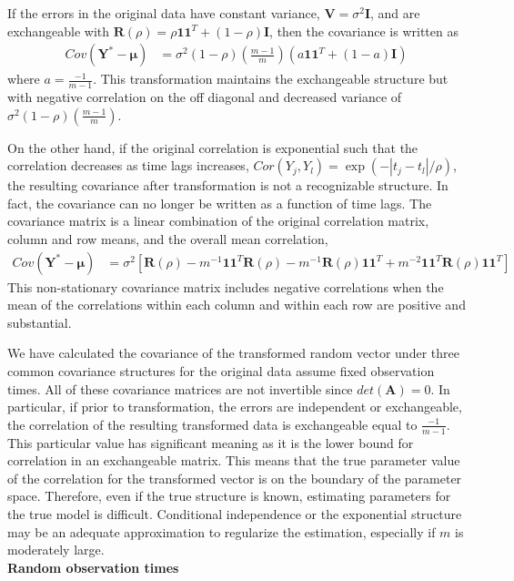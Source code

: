 \documentclass[12pt]{article}
\newcommand{\B}[0]{\mathbf}
\newcommand{\BS}[0]{\boldsymbol}
\begin{document}
 If the errors in the original data have constant variance, $\B V=\sigma^{2}\B I$, and are exchangeable with $\B R(\rho) = \rho\B 1 \B 1^{T} + (1-\rho)\B I$, then the covariance is written as
 \begin{align*}
 Cov(\B Y^{*}- \BS\mu) &=\sigma^{2}(1-\rho)\left(\frac{m-1}{m}\right)(a\B 1\B 1^{T}+ (1-a)\B I)
 \end{align*} 
 where $a=\frac{-1}{m-1}$. This transformation maintains the exchangeable structure but with negative correlation on the off diagonal and decreased variance of $\sigma^{2}(1-\rho)\left(\frac{m-1}{m}\right)$.

 On the other hand, if the original correlation is exponential such that the correlation decreases as time lags increases, $Cor(Y_{j},Y_{l}) = \exp(-|t_{j}-t_{l}|/\rho)$, the resulting covariance after transformation is not a recognizable structure. In fact, the covariance can no longer be written as a function of time lags. The covariance matrix is a linear combination of the original correlation matrix, column and row means, and the overall mean correlation,
   \begin{align*}
 Cov(\B Y^{*}- \BS\mu)  &= \sigma^{2}\left[\B R(\rho)-m^{-1}\B1\B1^{T}\B R(\rho)-m^{-1}\B R(\rho)\B1\B1^{T} + m^{-2}\B1\B1^{T}\B R(\rho)\B1\B1^{T}\right]
 \end{align*} 
 This non-stationary covariance matrix includes negative correlations when the mean of the correlations within each column and within each row are positive and substantial.
 
We have calculated the covariance of the transformed random vector under three common covariance structures for the original data assume fixed observation times. All of these covariance matrices are not invertible since $det(\B A) = 0$. In particular, if prior to transformation, the errors are independent or exchangeable, the correlation of the resulting transformed data is exchangeable equal to $\frac{-1}{m-1}$. This particular value has significant meaning as it is the lower bound for correlation in an exchangeable matrix. This means that the true parameter value of the correlation for the transformed vector is on the boundary of the parameter space. Therefore, even if the true structure is known, estimating parameters for the true model is difficult. Conditional independence or the exponential structure may be an adequate approximation to regularize the estimation, especially if $m$ is moderately large.\\

\noindent \textbf{Random observation times}
\end{document}
